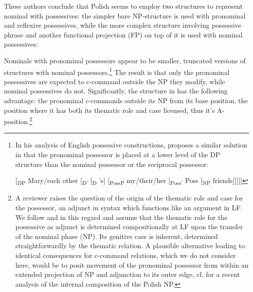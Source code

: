 \documentclass[output=paper,modfonts,nonflat
]{langsci/langscibook}
\begin{document}
\largerpage
\noindent These authors conclude that Polish seems to employ two structures to represent nominal with possessives: the simpler bare NP-structure is used with pronominal and reflexive possessives, while the more complex structure involving possessive phrase and another functional projection (FP) on top of it is used with nominal possessives:

\ea \label{ex:witkos:20}
	\z
\z
                        
\noindent Nominals with pronominal possessors appear to be smaller, truncated versions of structures with nominal possessors.\footnote{\label{fn16}In his analysis of English possessive constructions, \cite{despic2015} proposes a similar solution in that the pronominal possessor is placed at a lower level of the DP structure than the nominal possessor or the reciprocal possessor:

\ea
$[$\textsubscript{DP} Mary/each other [\textsubscript{D$’$} [\textsubscript{D} 's] [\textsubscript{PossP} my/their/her [\textsubscript{Poss$’$} Poss [\textsubscript{NP} friends$]]]]]$
\z} The result is that only the pronominal possessives are expected to c-command outside the NP they modify, while nominal possessives do not. Significantly, the structure in  has the following advantage: the pronominal c-commands outside its NP from its base position, the position where it has both its thematic role and case licensed, thus it’s A-position.\footnote{\label{fn17}A reviewer raises the question of the origin of the thematic role and case for the possessor, an adjunct in syntax which functions like an argument in LF. We follow \cite{boskovic2005locality,boskovic2012} and \cite{despic2011,despic2013,despic2015} in this regard and assume that the thematic role for the possessive as adjunct is determined compositionally at LF upon the transfer of the nominal phase (NP). Its genitive case is inherent, determined straightforwardly by the thematic relation. A plausible alternative leading to identical consequences for c-command relations, which we do not consider here, would be to posit movement of the pronominal possessor from within an extended projection of NP and adjunction to its outer edge, cf. \cite{ceglowski2017} for a recent analysis of the internal composition of the Polish NP.}
\end{document}
